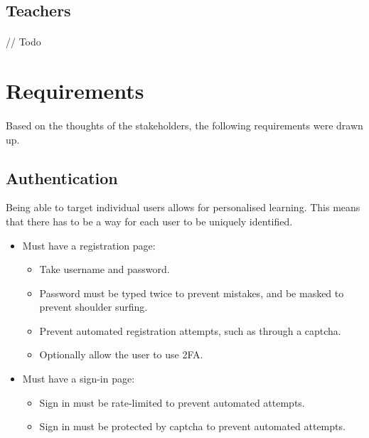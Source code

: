\documentclass{report}
\begin{document}
\subsection{Teachers}
\paragraph{}
// Todo

\section{Requirements}
\paragraph{}
Based on the thoughts of the stakeholders, the following requirements were drawn up.

\subsection{Authentication}
Being able to target individual users allows for personalised learning. This means that there has to be a way for each user to be uniquely identified.
\begin{itemize}
  \item Must have a registration page:
  \begin{itemize}
    \item Take username and password.
    \item Password must be typed twice to prevent mistakes, and be masked to prevent shoulder surfing.
    \item Prevent automated registration attempts, such as through a captcha.
    \item Optionally allow the user to use 2FA.
  \end{itemize}
  \item Must have a sign-in page:
  \begin{itemize}
    \item Sign in must be rate-limited to prevent automated attempts.
    \item Sign in must be protected by captcha to prevent automated attempts.
  \end{itemize}
\end{itemize}
\end{document}
